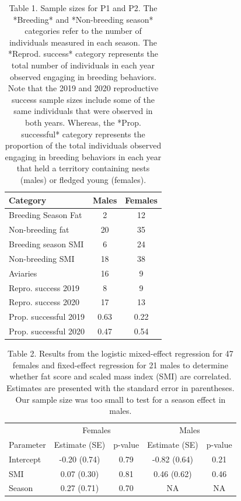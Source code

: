 \documentclass[
]{article}
\begin{document}
\begin{table}

\caption{\label{tab:sample size table}Table 1. Sample sizes for P1 and P2.  The *Breeding* and *Non-breeding season* categories refer to the number of individuals measured in each season. The *Reprod. success* category represents the total number of individuals in each year observed engaging in breeding behaviors. Note that the 2019 and 2020 reproductive success sample sizes include some of the same individuals that were observed in both years. Whereas, the *Prop. successful* category represents the proportion of the total individuals observed engaging in breeding behaviors in each year that held a territory containing nests (males) or fledged young (females).}
\centering
\begin{tabular}[t]{lcc}
\toprule
Category & Males & Females\\
\midrule
Breeding Season Fat & 2 & 12\\
Non-breeding fat & 20 & 35\\
Breeding season SMI & 6 & 24\\
Non-breeding SMI & 18 & 38\\
Aviaries & 16 & 9\\
\addlinespace
Repro. success 2019 & 8 & 9\\
Repro. success 2020 & 17 & 13\\
Prop. successful 2019 & 0.63 & 0.22\\
Prop. successful 2020 & 0.47 & 0.54\\
\bottomrule
\end{tabular}
\end{table}

\begin{table}

\caption{\label{tab:p1 results}Table 2. Results from the logistic mixed-effect regression for 47 females and fixed-effect regression for 21 males to determine whether fat score and scaled mass index (SMI) are correlated. Estimates are presented with the standard error in parentheses. Our sample size was too small to test for a season effect in males.}
\centering
\begin{tabular}[t]{lcccc}
\toprule
\multicolumn{1}{c}{ } & \multicolumn{2}{c}{Females} & \multicolumn{2}{c}{Males} \\
\cmidrule(l{3pt}r{3pt}){2-3} \cmidrule(l{3pt}r{3pt}){4-5}
Parameter & Estimate (SE) & p-value & Estimate (SE) & p-value\\
\midrule
Intercept & -0.20 (0.74) & 0.79 & -0.82 (0.64) & 0.21\\
SMI & 0.07 (0.30) & 0.81 & 0.46 (0.62) & 0.46\\
Season & 0.27 (0.71) & 0.70 & NA & NA\\
\bottomrule
\end{tabular}
\end{table}
\end{document}
